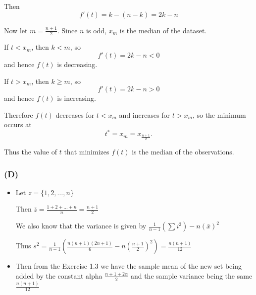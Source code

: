 \documentclass{article}
\begin{document}
Then
\[
f'(t) = k - (n-k) = 2k - n
\]

Now let \(m = \frac{n+1}{2}\). Since \(n\) is odd, \(x_m\) is the median of the dataset.

If \(t < x_m\), then \(k < m\), so
\[
f'(t) = 2k - n < 0
\]
and hence \(f(t)\) is decreasing.

If \(t > x_m\), then \(k \ge m\), so
\[
f'(t) = 2k - n > 0
\]
and hence \(f(t)\) is increasing.

Therefore \(f(t)\) decreases for \(t < x_m\) and increases for \(t > x_m\), so the minimum occurs at
\[
t^* = x_m = x_{\frac{n+1}{2}}.
\]

Thus the value of \(t\) that minimizes \(f(t)\) is the median of the observations.



\subsubsection*{(D)}
\begin{itemize}
	\item Let \( z= \{1,2, \dots, n\}\)

	      Then \( \bar{z} = \frac{1 + 2 + \dots + n}{n} = \frac{n+1}{2}\)

	      We also know that the variance is given by \(\frac{1}{n-1}(\sum i^2) - n(\bar{x})^2\)

	      Thus \( s^2=
\frac{1}{n-1}
\left(
\frac{n(n+1)(2n+1)}{6}
-
n\left(\frac{n+1}{2}\right)^2
\right)
=
\frac{n(n+1)}{12}
\)
	
	\item Then from the Exercise 1.3 we have the sample mean of the new set being added by the constant alpha
	\(\frac{n+1 + 2\alpha}{2}\) and the	sample variance being the same \(\frac{n(n+1)}{12}\)
\end{itemize}
\end{document}

